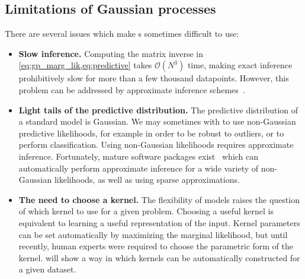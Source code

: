 \subsection{Limitations of Gaussian processes}

There are several issues which make \gp{}s sometimes difficult to use:

\begin{itemize}

\item {\bf Slow inference.}
Computing the matrix inverse in \cref{eq:gp_marg_lik,eq:predictive} takes $\mathcal{O}(N^3)$ time, making exact inference prohibitively slow for more than a few thousand datapoints.
However, this problem can be addressed by approximate inference schemes~\citep{snelson2006sparse, quinonero2005unifying, hensman2013gaussian}. 

\item {\bf Light tails of the predictive distribution.}
The predictive distribution of a standard \gp{} model is Gaussian.
We may sometimes with to use non-Gaussian predictive likelihoods, for example in order to be robust to outliers, or to perform classification.
Using non-Gaussian likelihoods requires approximate inference.
Fortunately, mature software packages exist~\citep{GPy, GPML, VanRiiHarJylVeh14} which can automatically perform approximate inference for a wide variety of non-Gaussian likelihoods, as well as using sparse approximations.

\item {\bf The need to choose a kernel.}
The flexibility of \gp{} models raises the question of which kernel to use for a given problem.
Choosing a useful kernel is equivalent to learning a useful representation of the input.
Kernel parameters can be set automatically by maximizing the marginal likelihood, but until recently, human experts were required to choose the parametric form of the kernel. %
 will show a way in which kernels can be automatically constructed for a given dataset.
\end{itemize}





